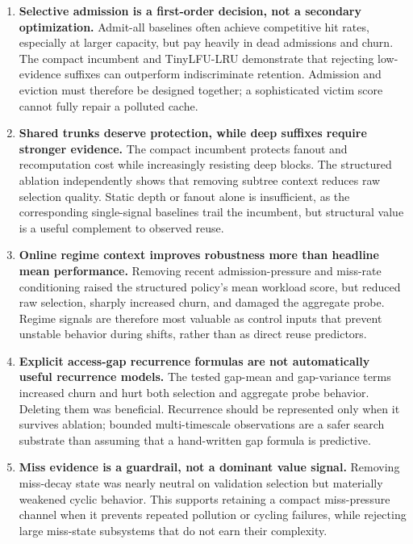 \documentclass[11pt]{article}
\begin{document}
\begin{enumerate}
  \item \textbf{Selective admission is a first-order decision, not a secondary
  optimization.}  Admit-all baselines often achieve competitive hit rates, especially
  at larger capacity, but pay heavily in dead admissions and churn.  The compact
  incumbent and TinyLFU-LRU demonstrate that rejecting low-evidence suffixes can
  outperform indiscriminate retention.  Admission and eviction must therefore be
  designed together; a sophisticated victim score cannot fully repair a polluted
  cache.

  \item \textbf{Shared trunks deserve protection, while deep suffixes require stronger
  evidence.}  The compact incumbent protects fanout and recomputation cost while
  increasingly resisting deep blocks.  The structured ablation independently shows
  that removing subtree context reduces raw selection quality.  Static depth or fanout
  alone is insufficient, as the corresponding single-signal baselines trail the
  incumbent, but structural value is a useful complement to observed reuse.

  \item \textbf{Online regime context improves robustness more than headline mean
  performance.}  Removing recent admission-pressure and miss-rate conditioning raised
  the structured policy's mean workload score, but reduced raw selection, sharply
  increased churn, and damaged the aggregate probe.  Regime signals are therefore most
  valuable as control inputs that prevent unstable behavior during shifts, rather than
  as direct reuse predictors.

  \item \textbf{Explicit access-gap recurrence formulas are not automatically useful
  recurrence models.}  The tested gap-mean and gap-variance terms increased churn and
  hurt both selection and aggregate probe behavior.  Deleting them was beneficial.
  Recurrence should be represented only when it survives ablation; bounded
  multi-timescale observations are a safer search substrate than assuming that a
  hand-written gap formula is predictive.

  \item \textbf{Miss evidence is a guardrail, not a dominant value signal.}  Removing
  miss-decay state was nearly neutral on validation selection but materially weakened
  cyclic behavior.  This supports retaining a compact miss-pressure channel when it
  prevents repeated pollution or cycling failures, while rejecting large miss-state
  subsystems that do not earn their complexity.


\end{enumerate}
\end{document}
